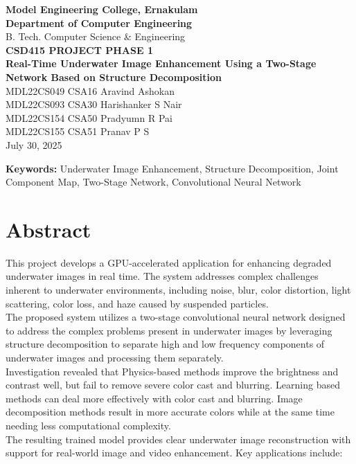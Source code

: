 \documentclass[12pt]{article}
\begin{document}
\begin{center}
    \textbf{Model Engineering College, Ernakulam}\\[4pt]
    \textbf{Department of Computer Engineering}\\[4pt]
    B. Tech. Computer Science \& Engineering\\[4pt]
    \textbf{CSD415 PROJECT PHASE 1}\\[.5cm]
    
    \LARGE{\textbf{Real-Time Underwater Image Enhancement Using a Two-Stage Network Based on Structure Decomposition}}\\[.5cm]
    
    \large{MDL22CS049 CSA16 Aravind Ashokan}\\[4pt]
    \large{MDL22CS093 CSA30 Harishanker S Nair}\\[4pt]
    \large{MDL22CS154 CSA50 Pradyumn R Pai}\\[4pt]
    \large{MDL22CS155 CSA51 Pranav P S}\\[.5cm]
    
    \large{July 30, 2025}
\end{center}

\noindent\textbf{Keywords:} Underwater Image Enhancement, Structure Decomposition, Joint Component Map, Two-Stage Network, Convolutional Neural Network

\section*{Abstract}
This project develops a GPU-accelerated application for enhancing degraded underwater images in real time.
The system addresses complex challenges inherent to underwater environments, including noise, blur, color distortion, light scattering, color loss, and haze caused by suspended particles.\\
The proposed system utilizes a two-stage convolutional neural network designed to address the complex problems present in underwater images by 
leveraging structure decomposition to separate high and low frequency components of underwater images and processing them separately.\\
Investigation revealed that Physics-based methods improve the brightness and contrast well, but fail to remove severe color cast and blurring. Learning based methods can deal more effectively with color cast and blurring. Image decomposition methods result in more accurate colors while at the same time needing less computational complexity.\\
The resulting trained model provides clear underwater image reconstruction with support for real-world image and video enhancement. Key applications include:
\end{document}
